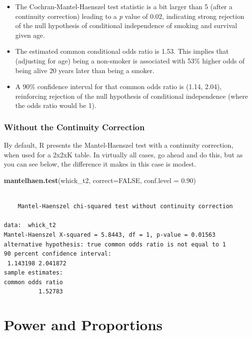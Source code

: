 \documentclass[
]{book}
\newenvironment{Shaded}{\begin{snugshade}}{\end{snugshade}}
\newcommand{\DataTypeTok}[1]{\textcolor[rgb]{0.13,0.29,0.53}{#1}}
\newcommand{\FloatTok}[1]{\textcolor[rgb]{0.00,0.00,0.81}{#1}}
\newcommand{\KeywordTok}[1]{\textcolor[rgb]{0.13,0.29,0.53}{\textbf{#1}}}
\newcommand{\NormalTok}[1]{#1}
\newcommand{\OtherTok}[1]{\textcolor[rgb]{0.56,0.35,0.01}{#1}}
\providecommand{\tightlist}{%
  \setlength{\itemsep}{0pt}\setlength{\parskip}{0pt}}
\begin{document}
\begin{itemize}
\tightlist
\item
  The Cochran-Mantel-Haenszel test statistic is a bit larger than 5 (after a continuity correction) leading to a \emph{p} value of 0.02, indicating strong rejection of the null hypothesis of conditional independence of smoking and survival given age.
\item
  The estimated common conditional odds ratio is 1.53. This implies that (adjusting for age) being a non-smoker is associated with 53\% higher odds of being alive 20 years later than being a smoker.
\item
  A 90\% confidence interval for that common odds ratio is (1.14, 2.04), reinforcing rejection of the null hypothesis of conditional independence (where the odds ratio would be 1).
\end{itemize}

\hypertarget{without-the-continuity-correction}{%
\subsection{Without the Continuity Correction}\label{without-the-continuity-correction}}

By default, R presents the Mantel-Haenszel test with a continuity correction, when used for a 2x2xK table. In virtually all cases, go ahead and do this, but as you can see below, the difference it makes in this case is modest.

\begin{Shaded}
\begin{Highlighting}[]
\KeywordTok{mantelhaen.test}\NormalTok{(whick_t2, }\DataTypeTok{correct=}\OtherTok{FALSE}\NormalTok{, }\DataTypeTok{conf.level =} \FloatTok{0.90}\NormalTok{)}
\end{Highlighting}
\end{Shaded}

\begin{verbatim}

	Mantel-Haenszel chi-squared test without continuity correction

data:  whick_t2
Mantel-Haenszel X-squared = 5.8443, df = 1, p-value = 0.01563
alternative hypothesis: true common odds ratio is not equal to 1
90 percent confidence interval:
 1.143198 2.041872
sample estimates:
common odds ratio 
          1.52783 
\end{verbatim}

\hypertarget{power-and-proportions}{%
\chapter{Power and Proportions}\label{power-and-proportions}}
\end{document}
